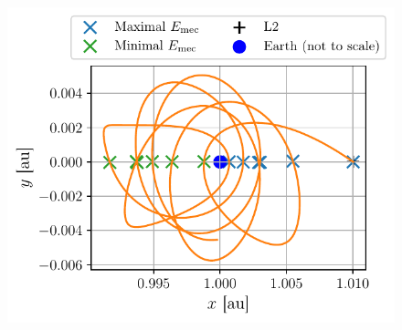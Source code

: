 \begin{figure}[H]
\begin{minipage}{.48\textwidth}
        \includegraphics[width=\linewidth]{figures/lagrange_max_mins_energy.pdf}
        \label{fig:lagrange_max_mins_energy}
    \end{minipage}
\end{figure}
